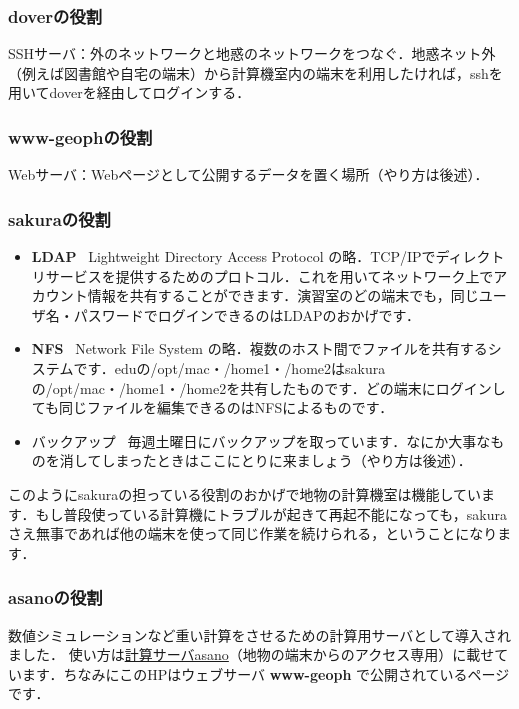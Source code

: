 \documentclass{jarticle}
\begin{document}
\subsubsection{doverの役割}
SSHサーバ：外のネットワークと地惑のネットワークをつなぐ．地惑ネット外（例えば図書館や自宅の端末）から計算機室内の端末を利用したければ，sshを用いてdoverを経由してログインする．

\subsubsection{www-geophの役割}
Webサーバ：Webページとして公開するデータを置く場所（やり方は後述）．

\subsubsection{sakuraの役割}
\begin{itemize}
\item {\bf LDAP} \ 
Lightweight Directory Access Protocol の略．TCP/IPでディレクトリサービスを提供するためのプロトコル．これを用いてネットワーク上でアカウント情報を共有することができます．演習室のどの端末でも，同じユーザ名・パスワードでログインできるのはLDAPのおかげです．

\item {\bf NFS} \ 
Network File System の略．複数のホスト間でファイルを共有するシステムです．eduの/opt/mac・/home1・/home2はsakuraの/opt/mac・/home1・/home2を共有したものです．どの端末にログインしても同じファイルを編集できるのはNFSによるものです．

\item バックアップ \ 
毎週土曜日にバックアップを取っています．なにか大事なものを消してしまったときはここにとりに来ましょう（やり方は後述）．
\end{itemize}

このようにsakuraの担っている役割のおかげで地物の計算機室は機能しています．もし普段使っている計算機にトラブルが起きて再起不能になっても，sakuraさえ無事であれば他の端末を使って同じ作業を続けられる，ということになります．

\subsubsection{asanoの役割}
数値シミュレーションなど重い計算をさせるための計算用サーバとして導入されました．
使い方は\href{http://www-geoph.eps.s.u-tokyo.ac.jp/~s162633/epp_computers/index.php?asano}{計算サーバasano}（地物の端末からのアクセス専用）に載せています．ちなみにこのHPはウェブサーバ {\bf www-geoph} で公開されているページです．
\end{document}
